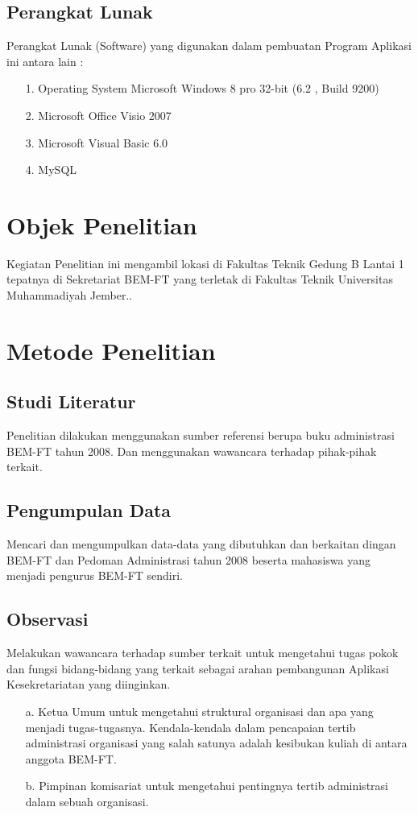 \documentclass{jtetiproposalskripsi}
\begin{document}
\subsection{Perangkat Lunak}
Perangkat Lunak (Software) yang digunakan dalam pembuatan Program Aplikasi ini antara lain :
\begin{itemize}
\item[1.] Operating System Microsoft Windows 8 pro 32-bit (6.2 , Build 9200)
\item[2.] Microsoft Office Visio 2007
\item[3.] Microsoft Visual Basic 6.0
\item[4.] MySQL
\end{itemize}
\section{Objek Penelitian}

Kegiatan Penelitian ini mengambil lokasi di Fakultas Teknik Gedung B Lantai 1 tepatnya di Sekretariat BEM-FT yang terletak di Fakultas Teknik Universitas Muhammadiyah Jember..

\section{Metode Penelitian}
\subsection{Studi Literatur}
Penelitian dilakukan menggunakan sumber referensi berupa buku  administrasi BEM-FT tahun 2008. Dan menggunakan wawancara terhadap pihak-pihak terkait.
\subsection{Pengumpulan Data}
Mencari  dan  mengumpulkan  data-data  yang  dibutuhkan  dan berkaitan dingan BEM-FT dan Pedoman Administrasi tahun 2008 beserta mahasiswa yang menjadi pengurus BEM-FT sendiri. 
\subsection{Observasi}
Melakukan wawancara terhadap sumber terkait untuk mengetahui tugas pokok dan fungsi bidang-bidang yang terkait sebagai arahan pembangunan Aplikasi Kesekretariatan yang diinginkan.
\begin{itemize}
\item[a.] Ketua Umum untuk mengetahui struktural organisasi dan apa yang menjadi tugas-tugasnya. Kendala-kendala dalam pencapaian tertib administrasi organisasi yang salah satunya adalah kesibukan kuliah di antara anggota BEM-FT.
\item[b.] Pimpinan komisariat untuk mengetahui pentingnya tertib administrasi dalam sebuah organisasi.
\end{itemize}
\end{document}
